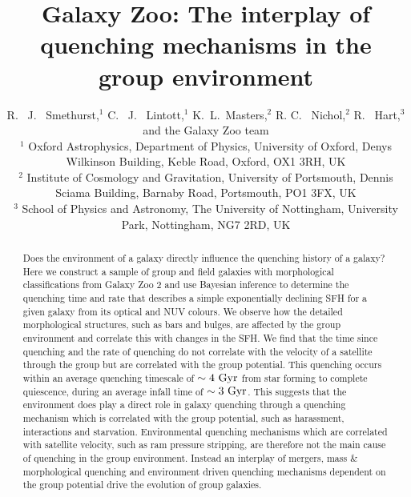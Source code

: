 \documentclass[useAMS,usenatbib]{mn2e}
\begin{document}
\title[Group environment quenching mechanisms]{Galaxy Zoo: The interplay of quenching mechanisms in the group environment}
\author[Smethurst et al. 2017]{R. ~J. ~Smethurst,$^{1}$ C. ~J. ~Lintott,$^{1}$ K.~L.~Masters,$^{2}$ R. C. ~Nichol,$^{2}$ \newauthor R. ~Hart,$^{3}$ and the Galaxy Zoo team \footnotemark[1]
\\ $^1$ Oxford Astrophysics, Department of Physics, University of Oxford, Denys Wilkinson Building, Keble Road, Oxford, OX1 3RH, UK 
\\ $^2$ Institute of Cosmology and Gravitation, University of Portsmouth, Dennis Sciama Building, Barnaby Road, Portsmouth, PO1 3FX, UK 
\\ $^3$ School of Physics and Astronomy, The University of Nottingham, University Park, Nottingham, NG7 2RD, UK
}

\maketitle

\begin{abstract}
Does the environment of a galaxy directly influence the quenching history of a galaxy? Here we construct a sample of group and field galaxies with morphological classifications from Galaxy Zoo 2 and use Bayesian inference to determine the quenching time and rate that describes a simple exponentially declining SFH for a given galaxy from its optical and NUV colours. We observe how the detailed morphological structures, such as bars and bulges, are affected by the group environment and correlate this with changes in the SFH. We find that the time since quenching and the rate of quenching do not correlate with the velocity of a satellite through the group but are correlated with the group potential. This quenching occurs within an average quenching timescale of $\sim4~\rm{Gyr}$ from star forming to complete quiescence, during an average infall time of $\sim 3 ~\rm{Gyr}$. This suggests that the environment does play a direct role in galaxy quenching through a quenching mechanism which is correlated with the group potential, such as harassment, interactions and starvation. Environmental quenching mechanisms which are correlated with satellite velocity, such as ram pressure stripping, are therefore not the main cause of quenching in the group environment. Instead an interplay of mergers, mass \& morphological quenching and environment driven quenching mechanisms dependent on the group potential drive the evolution of group galaxies. 

\end{abstract}
\end{document}
